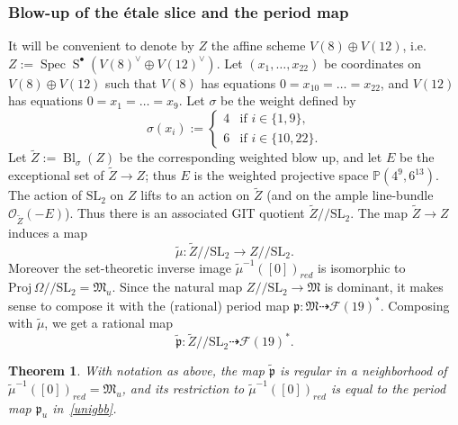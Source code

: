 \documentclass[11pt]{amsart}
\numberwithin{equation}{section}
\theoremstyle{plain}
\newtheorem{theorem}{Theorem}[section]
\theoremstyle{remark}
\theoremstyle{definition}
\def\Spec{\operatorname{Spec}}
\newcommand{\cF}{\mathscr{F}}
\newcommand{\gp}{\mathfrak{p}}
\newcommand{\SL}{\mathrm{SL}}
\newcommand{\Proj}{\mathrm{Proj}}
\newcommand{\gquot}{/\!\!/}
\DeclareMathOperator{\Bl}{Bl}
\newcommand{\cO}{{\mathscr O}}
\newcommand{\dra}{\dashrightarrow}
\newcommand{\gM}{\mathfrak{M}}
\newcommand{\lra}{\longrightarrow}
\newcommand{\PP}{{\mathbb P}}
\newcommand{\wt}{\widetilde}
\DeclareMathOperator{\Symm}{S}
\begin{document}
\subsubsection{Blow-up of the \'etale slice and the period map}\label{subsubsec:blowups}
%
It will be convenient to denote by $Z$ the affine scheme $V(8)\oplus V(12)$, i.e.~$Z:=\Spec\Symm^{\bullet}(V(8)^{\vee}\oplus V(12)^{\vee})$. 
Let  $(x_1,\ldots,x_{22})$ be  coordinates on  $V(8)\oplus V(12)$ such that $V(8)$ has equations $0=x_{10}=\ldots=x_{22}$, and 
 $V(12)$  has equations $0=x_{1}=\ldots=x_{9}$.
 Let $\sigma$ be the weight defined by 
%
\begin{equation}
%
\sigma(x_i):=
%
\begin{cases}
%
4 & \text{if $i\in\{1,9\}$,} \\
%
6 & \text{if $i\in\{10,22\}$.}
%
\end{cases}
%
\end{equation}
%
Let $\wt{Z}:=\Bl_{\sigma}(Z)$ be the corresponding weighted blow up, and 
 let $E$ be the exceptional set of $\wt{Z}\to Z$; thus $E$ is the weighted projective space $\PP(4^{9},6^{13})$. 
The action of $\SL_2$ on $Z$ lifts to an action on $\wt{Z}$ (and on the ample line-bundle $\cO_{\wt{Z}}(-E)$). Thus there is an associated GIT quotient  $\wt{Z}\gquot \SL_2$. 
The map   $\wt{Z}\to Z$ induces a map
%
\begin{equation}\label{duemu}
%
 \wt{\mu}\colon\wt{Z}\gquot \SL_2 \lra Z\gquot\SL_2.
%
\end{equation}
%
  Moreover 
the set-theoretic inverse image  $\wt{\mu}^{-1}([0])_{red}$ is isomorphic to  $\Proj\,\Omega\gquot\SL_2=\gM_u$. Since the natural map $Z\gquot\SL_2\to\gM$ is dominant, it makes  sense to compose it with the (rational) period map $\gp\colon\gM\dra\cF(19)^{*}$. Composing with $\wt{\mu}$, we get a rational map
%
\begin{equation}\label{dueper}
%
 \wt{\gp}\colon\wt{Z}\gquot \SL_2 \dra \cF(19)^{*}.
%
\end{equation}
%
%
\begin{theorem}\label{thm:firstblowup}
%
With notation as above, the   map $\wt{\gp}$ is regular in a neighborhood of $\wt{\mu}^{-1}([0])_{red}=\gM_u$, and its restriction to  $\wt{\mu}^{-1}([0])_{red}$ is equal to the period map $\gp_u$ in~\eqref{unigbb}. 
%
\end{theorem}
%
\end{document}

